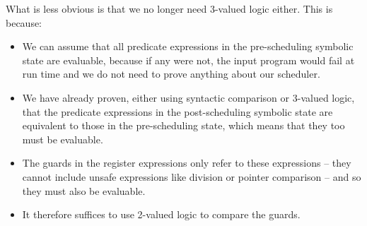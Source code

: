 {What is less obvious is that we no longer need 3-valued logic either. This is
because:
\begin{itemize}
\item We can assume that all predicate expressions in the pre-scheduling
  symbolic state are evaluable, because if any were not, the input program would
  fail at run time and we do not need to prove anything about our scheduler.
\item We have already proven, either using syntactic comparison or 3-valued
  logic, that the predicate expressions in the post-scheduling symbolic state
  are equivalent to those in the pre-scheduling state, which means that they too
  must be evaluable.
\item The guards in the register expressions only refer to these expressions --
  they cannot include unsafe expressions like division or pointer comparison --
  and so they must also be evaluable.
\item It therefore suffices to use 2-valued logic to compare the guards.
\end{itemize}

}
